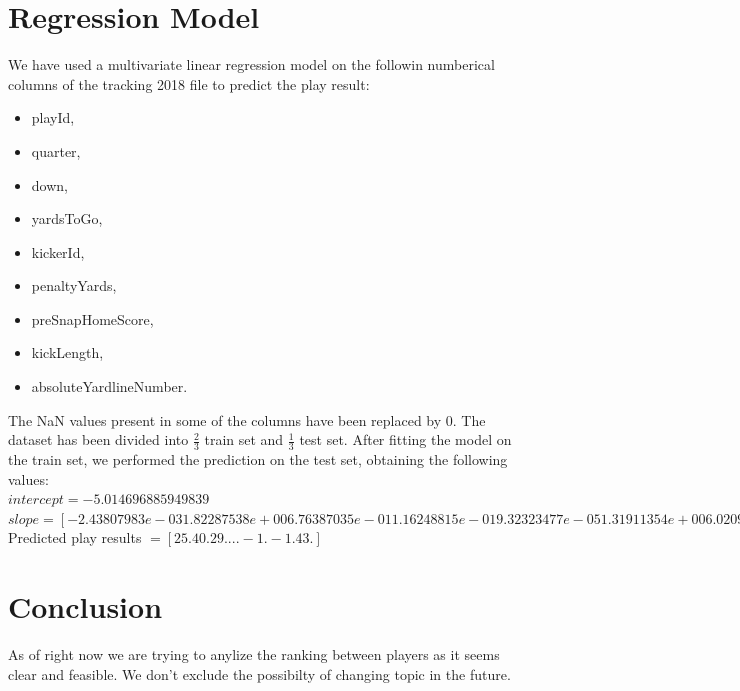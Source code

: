 \documentclass{article}
\begin{document}
\section{Regression Model}
We have used a multivariate linear regression model on the followin numberical columns of the tracking 2018 file to predict the play result:
\begin{itemize}
	\item playId,
	\item quarter,
	\item down,
	\item yardsToGo,
	\item kickerId,
	\item penaltyYards,
	\item preSnapHomeScore,
	\item kickLength,
	\item absoluteYardlineNumber.
\end{itemize}
The NaN values present in some of the columns have been replaced by 0.
The dataset has been divided into $\frac{2}{3}$ train set and $\frac{1}{3}$ test set. After fitting the model on the train set, we performed the prediction on the test set, obtaining the following values:\\
$intercept = -5.014696885949839 $\\
$slope = [-2.43807983e-03  1.82287538e+00  6.76387035e-01  1.16248815e-01
  9.32323477e-05  1.31911354e+00  6.02097301e-02  5.91721982e-01
 -2.49419762e-03]$\\
Predicted play results $= [25. 40. 29. ... -1. -1. 43.]$
\section{Conclusion}
As of right now we are trying to anylize the ranking between players as it seems clear and feasible. We don't exclude the possibilty of changing topic in the future.
\end{document}
